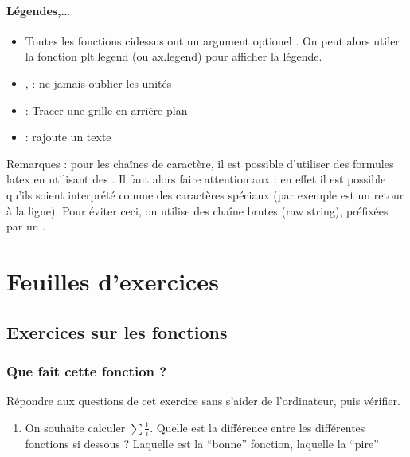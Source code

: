 \documentclass[letterpaper,10pt,english]{sphinxhowto}
\begin{document}
\paragraph{Légendes,…}
\label{\detokenize{cours7_graphiques_cours:legendes}}\begin{itemize}
\item {} 
\sphinxAtStartPar
Toutes les fonctions ci\sphinxhyphen{}dessus ont un argument optionel . On peut alors utiler la fonction plt.legend (ou ax.legend) pour afficher la légende.

\item {} 
\sphinxAtStartPar
{},  : ne jamais oublier les unités

\item {} 
\sphinxAtStartPar
{} : Tracer une grille en arrière plan

\item {} 
\sphinxAtStartPar
{} : rajoute un texte

\end{itemize}

\sphinxAtStartPar
Remarques : pour les chaînes de caractère, il est possible d’utiliser des formules latex en utilisant des \sphinxcode{\sphinxupquote{\$}}. Il faut alors faire attention aux \sphinxcode{\sphinxupquote{\textbackslash{}}} : en effet il est possible qu’ils soient interprété comme des caractères spéciaux (par exemple  est un retour à la ligne). Pour éviter ceci, on utilise des chaîne brutes (raw string), préfixées par un .


\section{Feuilles d’exercices}
\label{\detokenize{feuilles_d_exercices:feuilles-d-exercices}}\label{\detokenize{feuilles_d_exercices::doc}}

\subsection{Exercices sur les fonctions}
\label{\detokenize{cours1_fonctions_exercices:exercices-sur-les-fonctions}}\label{\detokenize{cours1_fonctions_exercices::doc}}

\subsubsection{Que fait cette fonction ?}
\label{\detokenize{cours1_fonctions_exercices:que-fait-cette-fonction}}
\sphinxAtStartPar
Répondre aux questions de cet exercice sans s’aider de l’ordinateur, puis vérifier.
\begin{enumerate}
%
\item {} 
\sphinxAtStartPar
On souhaite calculer \(\sum \frac{1}{i}\). Quelle est la différence entre les différentes fonctions si dessous ? Laquelle est la “bonne” fonction, laquelle la “pire”

\end{enumerate}
\end{document}
